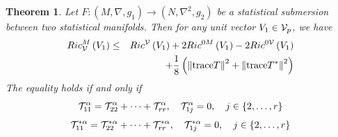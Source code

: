 \documentclass[10pt,a4paper]{article}
\newtheorem{theorem}{Theorem}[section]
\theoremstyle{definition}
\theoremstyle{remark}
\numberwithin{equation}{section}
\begin{document}
\begin{theorem}\cite{SiddiquiChenSiddiqi2021}
\label{Theorem-CR-vert}Let $F:\left( M,\nabla ,g_{1}\right) \rightarrow
\left( N,\nabla ^{2},g_{2}\right) $ be a statistical submersion between two
statistical manifolds. Then for any unit vector $V_{1}\in {\cal V}_{p}$, we
have%
\begin{eqnarray*}
Ric_{{\cal V}}^{M}\left( V_{1}\right) &\leq &Ric^{{\cal V}}\left(
V_{1}\right) +2Ric^{0M}\left( V_{1}\right) -2Ric^{0{\cal V}}\left(
V_{1}\right) \\
&&+\frac{1}{8}\left( \left\Vert {\rm trace}T\right\Vert ^{2}+\left\Vert {\rm %
trace}T^{\ast }\right\Vert ^{2}\right)
\end{eqnarray*}%
The equality holds if and only if%
\[
{\cal T}_{11}^{\alpha }={\cal T}_{22}^{\alpha }+\cdots +{\cal T}%
_{rr}^{\alpha },\quad {\cal T}_{1j}^{\alpha }=0,\quad j\in \left\{ 2,\ldots
,r\right\} 
\]%
\[
{\cal T}_{11}^{\ast \alpha }={\cal T}_{22}^{\ast \alpha }+\cdots +{\cal T}%
_{rr}^{\ast \alpha },\quad {\cal T}_{1j}^{\ast \alpha }=0,\quad j\in \left\{
2,\ldots ,r\right\} 
\]
\end{theorem}
\end{document}
